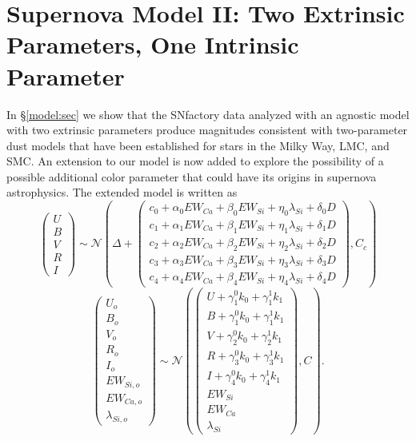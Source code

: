 \documentclass{aastex61}   	%
\begin{document}
\section{Supernova Model II: Two Extrinsic Parameters, One Intrinsic Parameter}
\label{model2:sec}
In \S\ref{model:sec} we show that the SNfactory data analyzed with an agnostic model with
two extrinsic parameters produce
magnitudes consistent
with two-parameter dust models that have been established for stars in the Milky Way, LMC, and SMC.
An extension to our model is now added to explore the possibility of
a possible additional
color parameter that could have its origins in supernova astrophysics.
The extended model is written as
\begin{equation}
\begin{pmatrix}
U\\B\\V\\R\\I
\end{pmatrix}
\sim \mathcal{N}
\left(
\Delta +
\begin{pmatrix}
c_0+\alpha_0 EW_{Ca} + \beta_0 EW_{Si} + \eta_0 \lambda_{Si} + \delta_0 D\\
c_1+\alpha_1 EW_{Ca} + \beta_1 EW_{Si} + \eta_1 \lambda_{Si} + \delta_1 D \\
c_2+\alpha_2 EW_{Ca} + \beta_2 EW_{Si} + \eta_2 \lambda_{Si} + \delta_2 D\\
c_3+\alpha_3 EW_{Ca} + \beta_3 EW_{Si} + \eta_3 \lambda_{Si} + \delta_3 D\\
c_4+\alpha_4 EW_{Ca} + \beta_4 EW_{Si}+ \eta_4 \lambda_{Si} + \delta_4 D
\end{pmatrix}
,C_{c}
\right)
\label{ewsiv:eqn}
\end{equation}
\begin{equation}
\begin{pmatrix}
U_o\\B_o\\ V_o\\R_o\\I_o\\EW_{Si, o}\\ EW_{Ca, o} \\ \lambda_{Si, o}
\end{pmatrix}
\sim \mathcal{N}
\left(
\begin{pmatrix}
U +\gamma^0_{1} k_0 +\gamma^1_{1} k_1 \\B +\gamma^0_{1} k_0 +\gamma^1_{1} k_1 \\
V+\gamma^0_{2} k_0+\gamma^1_{2} k_1\\R+\gamma^0_{3} k_0 + \gamma^1_{3} k_1\\I+\gamma^0_{4} k_0+\gamma^1_{4} k_1\\
EW_{Si}\\ EW_{Ca} \\ \lambda_{Si}
\end{pmatrix}
,C
\right).
\label{dust:eqn}
\end{equation}
\end{document}
